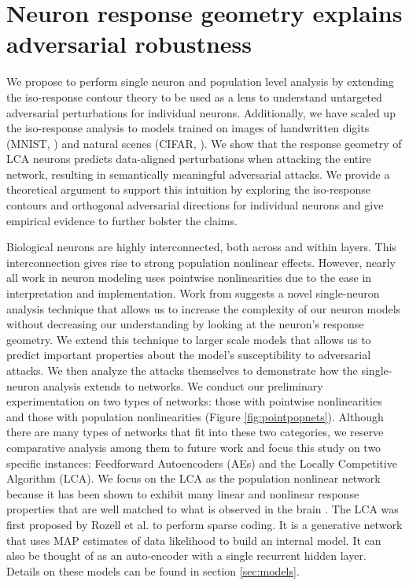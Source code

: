 \section{Neuron response geometry explains adversarial robustness}\label{neuron}
We propose to perform single neuron and population level analysis by extending the iso-response contour theory to be used as a lens to understand untargeted adversarial perturbations for individual neurons. Additionally, we have scaled up the iso-response analysis to models trained on images of handwritten digits (MNIST, \cite{citation}) and natural scenes (CIFAR, \cite{citation}). We show that the response geometry of LCA neurons predicts data-aligned perturbations when attacking the entire network, resulting in semantically meaningful adversarial attacks. We provide a theoretical argument to support this intuition by exploring the iso-response contours and orthogonal adversarial directions for individual neurons and give empirical evidence to further bolster the claims. 

Biological neurons are highly interconnected, both across and within layers. This interconnection gives rise to strong population nonlinear effects. However, nearly all work in neuron modeling uses pointwise nonlinearities due to the ease in interpretation and implementation. Work from \citeyearpar{golden2016conjectures} suggests a novel single-neuron analysis technique that allows us to increase the complexity of our neuron models without decreasing our understanding by looking at the neuron’s response geometry. We extend this technique to larger scale models that allows us to predict important properties about the model’s susceptibility to adversarial attacks. We then analyze the attacks themselves to demonstrate how the single-neuron analysis extends to networks. We conduct our preliminary experimentation on two types of networks: those with pointwise nonlinearities and those with population nonlinearities (Figure \ref{fig:pointpopnets}). Although there are many types of networks that fit into these two categories, we reserve comparative analysis among them to future work and focus this study on two specific instances: Feedforward Autoencoders (AEs) and the Locally Competitive Algorithm (LCA). We focus on the LCA as the population nonlinear network because it has been shown to exhibit many linear and nonlinear response properties that are well matched to what is observed in the brain \cite{zhu2013visual, olshausen1997sparse}. The LCA was first proposed by Rozell et al. \citeyearpar{rozell2008sparse} to perform sparse coding. It is a generative network that uses MAP estimates of data likelihood to build an internal model. It can also be thought of as an auto-encoder with a single recurrent hidden layer. Details on these models can be found in section \ref{sec:models}.

